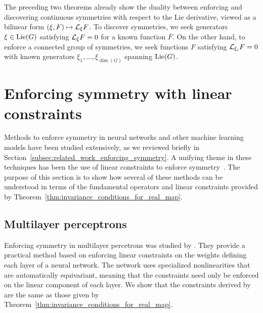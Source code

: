 \documentclass[twoside,11pt]{article}
\begin{document}
The preceding two theorems already show the duality between enforcing and discovering continuous symmetries with respect to the Lie derivative, viewed as a bilinear form $(\xi, F) \mapsto {\mathcal{L}}_{\xi} F$.
To discover symmetries, we seek generators $\xi \in \operatorname{Lie}(G)$ satisfying ${\mathcal{L}}_{\xi} F = 0$ for a known function $F$.
On the other hand, to enforce a connected group of symmetries, we seek functions $F$ satisfying ${\mathcal{L}}_{\xi_i} F = 0$ with known generators $\xi_1, \ldots, \xi_{\dim(G)}$ spanning $\operatorname{Lie}(G)$. 

\section{Enforcing symmetry with linear constraints}
\label{sec:enforcing_symmetry}
Methods to enforce symmetry in neural networks and other machine learning models have been studied extensively, as we reviewed briefly in Section~\ref{subsec:related_work_enforcing_symmetry}.
A unifying theme in these techniques has been the use of linear constraints to enforce symmetry~\citep{Finzi2021practical,Loiseau2017jfm,weiler20183d,Cohen2019general,Ahmadi2020learning_short}.
The purpose of this section is to show how several of these methods can be understood in terms of the fundamental operators and linear constraints provided by Theorem~\ref{thm:invariance_conditions_for_real_map}.

\subsection{Multilayer perceptrons}
Enforcing symmetry in multilayer percetrons was studied by \cite{Finzi2021practical}.
They provide a practical method based on enforcing linear constraints on the weights defining each layer of a neural network.
The network uses specialized nonlinearities that are automatically equivariant, meaning that the constraints need only be enforced on the linear component of each layer.
We show that the constraints derived by \cite{Finzi2021practical} are the same as those given by Theorem~\ref{thm:invariance_conditions_for_real_map}.
\end{document}
